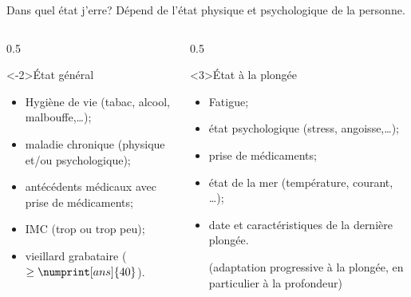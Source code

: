 \begin{frame}{Dans quel état j'erre?}
Dépend de l'état physique et psychologique de la personne.
\begin{columns}[t]
\begin{column}{0.5\textwidth}
\begin{block}<-2>{\centering État général}
\begin{itemize}
\item Hygiène de vie (tabac, alcool, malbouffe,\dots);
\item<alert@2> maladie chronique (physique et/ou psychologique);
\item<alert@2> antécédents médicaux avec prise de médicaments;
\item IMC (trop ou trop peu);
\item vieillard grabataire ($\ge \numprint[ans]{40}$).
\end{itemize}
\end{block}
\end{column}
\begin{column}{0.5\textwidth}
\begin{block}<3>{\centering État à la plongée}
\begin{itemize}
\item Fatigue;
\item état psychologique (stress, angoisse,\dots);
\item prise de médicaments;
\item état de la mer (température, courant, \dots);
\item date et caractéristiques de la dernière plongée.

{\scriptsize (adaptation progressive à la plongée, en particulier à la profondeur)}
\end{itemize}
\end{block}
\end{column}%
\end{columns}
\end{frame}


